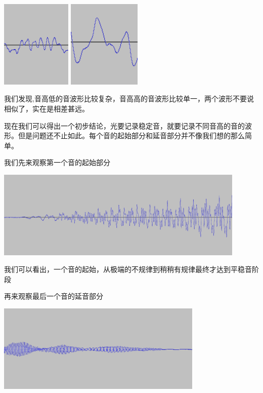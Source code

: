 \begin{center}
    \includegraphics[height=4.2cm]{celloFirstStableBig.png}
    \includegraphics[height=4.2cm]{anotherNoteBig.png}
\end{center}
\vspace{1cm}
\par
我们发现,音高低的音波形比较复杂，音高高的音波形比较单一，两个波形不要说相似了，实在是相差甚远。
\par 
现在我们可以得出一个初步结论，光要记录稳定音，就要记录不同音高的音的波形。但是问题还不止如此。每个音的起始部分和延音部分并不像我们想的那么简单。
\par
我们先来观察第一个音的起始部分
\vspace{1cm}
\begin{center}
    \includegraphics[height=4.2cm]{celloFirstScale.png}
\end{center}
\vspace{1cm}
\par
我们可以看出，一个音的起始，从极端的不规律到稍稍有规律最终才达到平稳音阶段
\par 
再来观察最后一个音的延音部分
\vspace{1cm}
\begin{center}
    \includegraphics[height=4.2cm]{celloLastScale.png}
\end{center}
